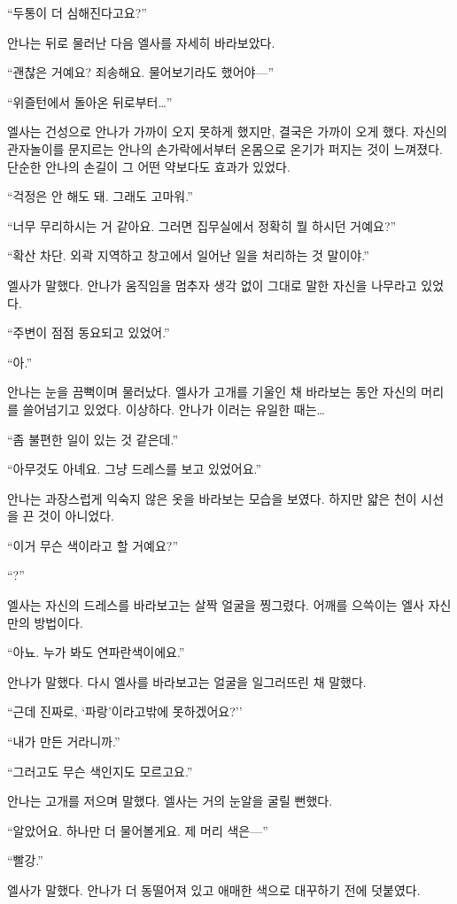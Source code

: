 ``두통이 더 심해진다고요?''

안나는 뒤로 물러난 다음 엘사를 자세히 바라보았다.

``괜찮은 거예요? 죄송해요. 물어보기라도 했어야—''

``위즐턴에서 돌아온 뒤로부터\ldots''

엘사는 건성으로 안나가 가까이 오지 못하게 했지만, 결국은 가까이 오게 했다. 자신의 관자놀이를 문지르는 안나의 손가락에서부터 온몸으로 온기가 퍼지는 것이 느껴졌다. 단순한 안나의 손길이 그 어떤 약보다도 효과가 있었다.

``걱정은 안 해도 돼. 그래도 고마워.''

``너무 무리하시는 거 같아요. 그러면 집무실에서 정확히 뭘 하시던 거예요?''

``확산 차단. 외곽 지역하고 창고에서 일어난 일을 처리하는 것 말이야.''

엘사가 말했다. 안나가 움직임을 멈추자 생각 없이 그대로 말한 자신을 나무라고 있었다.

``주변이 점점 동요되고 있었어.''

``아.''

안나는 눈을 끔뻑이며 물러났다. 엘사가 고개를 기울인 채 바라보는 동안 자신의 머리를 쓸어넘기고 있었다. 이상하다. 안나가 이러는 유일한 때는\ldots

``좀 불편한 일이 있는 것 같은데.''

``아무것도 아녜요. 그냥 드레스를 보고 있었어요.''

안나는 과장스럽게 익숙지 않은 옷을 바라보는 모습을 보였다. 하지만 얇은 천이 시선을 끈 것이 아니었다.

``이거 무슨 색이라고 할 거예요?''

``?''

엘사는 자신의 드레스를 바라보고는 살짝 얼굴을 찡그렸다. 어깨를 으쓱이는 엘사 자신만의 방법이다.

``아뇨. 누가 봐도 연파란색이에요.''

안나가 말했다. 다시 엘사를 바라보고는 얼굴을 일그러뜨린 채 말했다.

``근데 진짜로, `파랑'이라고밖에 못하겠어요?''

``내가 만든 거라니까.''

``그러고도 무슨 색인지도 모르고요.''

안나는 고개를 저으며 말했다. 엘사는 거의 눈알을 굴릴 뻔했다.

``알았어요. 하나만 더 물어볼게요. 제 머리 색은—''

``빨강.''

엘사가 말했다. 안나가 더 동떨어져 있고 애매한 색으로 대꾸하기 전에 덧붙였다.

